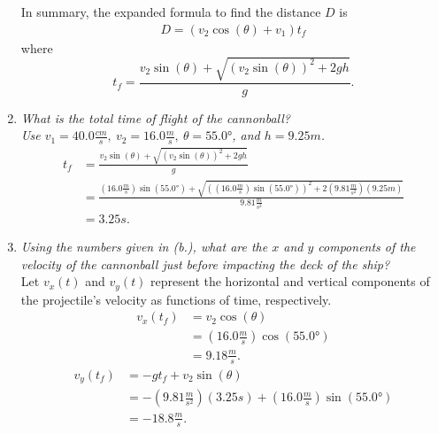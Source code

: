 \documentclass[12pt]{article}
\begin{document}
\begin{enumerate}[label=(\alph*)]
	In summary, the expanded formula to find the distance $D$ is
	\begin{gather*}
		\boxed{D = (v_2\cos(\theta) + v_1) t_f}
	\end{gather*}
	where
	\begin{equation*}
		\boxed{
			t_f = \frac{v_2\sin(\theta)
			+ \sqrt{(v_2\sin(\theta))^2 + 2gh}}{g}
		}.
	\end{equation*}
	\item \textit{What is the total time of flight of the cannonball? \\
	Use $v_1 = 40.0\si{\frac{cm}{s}},\ v_2 = 16.0\si{\frac{m}{s}},\ 
	\theta = \ang{55.0}$, and $h = 9.25\si{m}$.}
	\begin{align*}
		t_f
		&= \frac{v_2\sin(\theta) + \sqrt{(v_2\sin(\theta))^2 + 2gh}}{g} \\
		&= \frac
			{
				(16.0\si{\frac{m}{s}}) \sin(\ang{55.0})
				+ \sqrt{
					((16.0\si{\frac{m}{s}}) \sin(\ang{55.0}))^2
					+ 2 (9.81\si{\frac{m}{s^2}}) (9.25\si{m})
				}
			}
			{9.81\si{\frac{m}{s^2}}}
			\\
		&= \boxed{3.25\si{s}}.
	\end{align*}
	\item \textit{Using the numbers given in (b.), what are the $x$ and $y$
	components of the velocity of the cannonball just before impacting the
	deck of the ship?} \\[\baselineskip]
	Let $v_x(t)$ and $v_y(t)$ represent the horizontal and vertical components
	of the projectile's velocity as functions of time, respectively.
	\begin{align*}
		v_x(t_f)
		&= v_2\cos(\theta) \\
		&= (16.0\si{\frac{m}{s}}) \cos(\ang{55.0}) \\
		&= \boxed{9.18\si{\frac{m}{s}}}.
	\end{align*}
	\begin{align*}
		v_y(t_f)
		&= -gt_f + v_2\sin(\theta) \\
		&= -(9.81\si{\frac{m}{s^2}}) (3.25\si{s})
			+ (16.0\si{\frac{m}{s}}) \sin(\ang{55.0}) \\
		&= \boxed{-18.8\si{\frac{m}{s}}}.
	\end{align*}
\end{enumerate}
\end{document}
